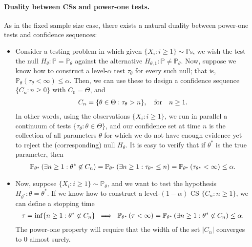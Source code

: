 \documentclass[12pt]{article}
\begin{document}
\paragraph{Duality between CSs and power-one tests.} As in the fixed sample size case, there exists a natural duality between power-one tests and confidence sequences: 
\begin{itemize}
    \item Consider a testing problem in which given $\{X_i: i \geq 1\} \sim \mathbb{P}$s, we wish the test the null $H_\theta: \mathbb{P}=\mathbb{P}_\theta$ against the alternative $H_{\theta, 1}: \mathbb{P}\neq\mathbb{P}_\theta$. Now, suppose we know how to construct a level-$\alpha$ test $\tau_\theta$ for every such null; that is, $\mathbb{P}_{\theta}(\tau_\theta < \infty) \leq \alpha$. Then, we can use these to design a confidence sequence $\{C_n: n \geq 0\}$ with $C_0=\Theta$, and 
    \begin{align}
        C_n = \{\theta \in \Theta: \tau_\theta > n\}, \quad \text{for} \quad n\geq 1. 
    \end{align}
    In other words, using the observations $\{X_i: i \geq 1\}$, we run in parallel a continuum of tests $\{\tau_\theta: \theta \in \Theta\}$, and our confidence set at time $n$ is the collection of all parameters $\theta$ for which we do not have enough evidence yet to reject the (corresponding) null $H_\theta$. It is easy to verify that if $\theta^*$ is the true parameter, then 
    \begin{align}
        \mathbb{P}_{\theta^*}\left( \exists n \geq 1: \theta^* \not \in C_n \right) = \mathbb{P}_{\theta^*}\left( \exists n \geq 1: \tau_{\theta^*} \leq n \right)  =  \mathbb{P}_{\theta^*}\left(  \tau_{\theta^*}  < \infty \right)   \leq \alpha. 
    \end{align}
    \item Now, suppose $\{X_i: i \geq 1\} \sim \mathbb{P}_{\theta}$, and we want to test the hypothesis $H_{\theta^*}: \theta = \theta^*$. If we know how to construct a  level-$(1-\alpha)$ CS $\{C_n: n \geq 1\}$, we can define a stopping time 
    \begin{align}
        \tau = \inf \{n \geq 1: \theta^* \not \in C_n\} \; \implies \;  \mathbb{P}_{\theta^*}\left( \tau < \infty \right) = \mathbb{P}_{\theta^*}\left( \exists n \geq 1: \theta^* \not \in C_n \right) \leq \alpha. 
    \end{align}
    The power-one property will require that the width of the set $|C_n|$ converges to $0$ almost surely. 
\end{itemize}
\end{document}
